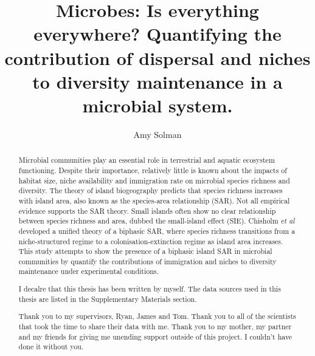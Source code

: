 \documentclass[a4paper, twoside]{report}
\title{Microbes: Is everything everywhere? Quantifying the contribution of dispersal and niches to diversity maintenance in a microbial system.}
\author{Amy Solman}
\begin{document}


\begin{abstract}
Microbial communities play an essential role in terrestrial and aquatic ecosystem functioning. Despite their importance, relatively little is known about the impacts of habitat size, niche availability and immigration rate on microbial species richness and diversity. The theory of island biogeography predicts that species richness increases with island area, also known as the species-area relationship (SAR). Not all empirical evidence supports the SAR theory. Small islands often show no clear relationship between species richness and area, dubbed the small-island effect (SIE). Chisholm \textit{et al} \cite{chisholm2016maintenance} developed a unified theory of a biphasic SAR, where species richness transitions from a niche-structured regime to a colonisation-extinction regime as island area increases. This study attempts to show the presence of a biphasic island SAR in microbial communities by quantify the contributions of immigration and niches to diversity maintenance under experimental conditions.
\end{abstract}

\renewcommand{\abstractname}{Declaration}
\begin{abstract}
I decalre that this thesis has been written by myself. The data sources used in this thesis are listed in the Supplementary Materials section.
\end{abstract}

\renewcommand{\abstractname}{Acknowledgements}
\begin{abstract}
Thank you to my supervisors, Ryan, James and Tom. Thank you to all of the scientists that took the time to share their data with me. Thank you to my mother, my partner and my friends for giving me unending support outside of this project. I couldn't have done it without you.
\end{abstract}

\tableofcontents
\listoffigures
\listoftables










\end{document}
